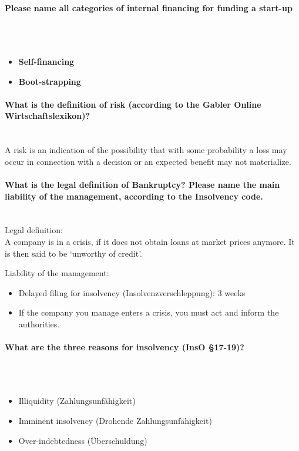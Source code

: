 \documentclass[10pt,a4paper,noendnumber=true]{scrartcl}
\newcommand{\properparagraph}[1]{\paragraph{\textcolor{Emerald}{#1}}\mbox{}\\}
\begin{document}
\properparagraph{Please name all categories of internal financing for funding a start-up}
\\[-6ex]
\begin{itemize}
	\item \textbf{Self-financing}
	\item \textbf{Boot-strapping}
\end{itemize}


\properparagraph{What is the definition of risk (according to the Gabler Online Wirtschaftslexikon)?}
A risk is an indication of the possibility that with some probability a loss
may occur in connection with a decision or an expected benefit may
not materialize.


\properparagraph{What is the legal definition of Bankruptcy? Please name the main liability of the management, according to the Insolvency code.}
Legal definition:\\
A company is in a crisis, if it does not obtain loans at market prices
anymore. It is then said to be ‘unworthy of credit’.

Liability of the management:\\
\begin{itemize}
	\item Delayed filing for insolvency (Insolvenzverschleppung): 3 weeks
	\item If the company you manage enters a crisis, you must act and inform the
	authorities.
\end{itemize}

\properparagraph{What are the three reasons for insolvency (InsO §17-19)?}
\\[-6ex]
\begin{itemize}
	\item Illiquidity (Zahlungsunfähigkeit)
	\item Imminent insolvency (Drohende Zahlungsunfähigkeit)
	\item Over-indebtedness (Überschuldung)
\end{itemize}
\end{document}

